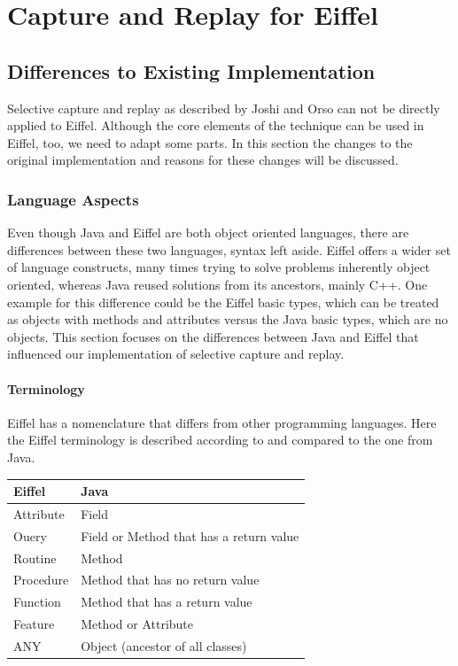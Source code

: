 \chapter{Capture and Replay for Eiffel}
\eiffellisting
\section{Differences to Existing Implementation}
Selective capture and replay as described by Joshi and Orso \cite{orso05may} can not be directly applied to Eiffel. Although the core elements of the technique can be used in Eiffel, too, we need to adapt some parts. In this section the changes to the original implementation and reasons for these changes will be discussed.

\subsection{Language Aspects}
Even though Java and Eiffel are both object oriented languages, there are differences between these two languages, syntax left aside. Eiffel offers a wider set of language constructs, many times trying to solve problems inherently object oriented, whereas Java reused solutions from its ancestors, mainly C++. One example for this difference could be the Eiffel basic types, which can be treated as objects with methods and attributes versus the Java basic types, which are no objects. This section focuses on the differences between Java and Eiffel that influenced our implementation of selective capture and replay.

\subsubsection{Terminology} %
Eiffel has a nomenclature that differs from other programming languages. Here the Eiffel terminology is described according to \cite{oosc2} and compared to the one from Java.
\begin{center}
\begin{tabular}[]{|l|l|} \hline
 \textbf{Eiffel}&\textbf{Java} \\ \hline
 Attribute&Field \\ \hline
 Ouery&Field or Method that has a return value \\ \hline
 Routine&Method \\ \hline
 Procedure&Method that has no return value \\ \hline
 Function&Method that has a return value \\ \hline
 Feature&Method or Attribute \\ \hline
 ANY&Object (ancestor of all classes) \\ \hline
\end{tabular} 
\end{center}

